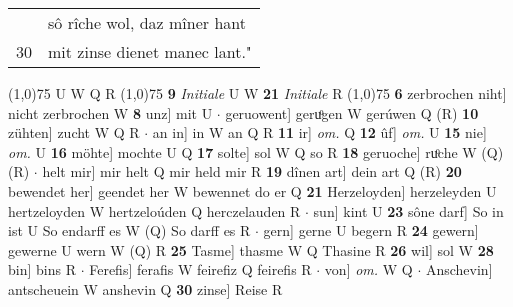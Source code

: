 \documentclass[8pt,a4paper,notitlepage]{article}
\begin{document}
\begin{table}[ht]
\begin{minipage}[t]{0.5\linewidth}
\begin{tabular}{rl}
 & sô rîche wol, daz mîner hant\\ 
30 & mit zinse dienet manec lant."\\ 
\end{tabular}
\scriptsize
\line(1,0){75} \newline
U W Q R \newline
\line(1,0){75} \newline
\textbf{9} \textit{Initiale} U W  \textbf{21} \textit{Initiale} R  \newline
\line(1,0){75} \newline
\textbf{6} zerbrochen niht] nicht zerbrochen W \textbf{8} unz] mit U  $\cdot$ geruowent] geruͦgen W gerúwen Q (R) \textbf{10} zühten] zucht W Q R  $\cdot$ an in] in W an Q R \textbf{11} ir] \textit{om.} Q \textbf{12} ûf] \textit{om.} U \textbf{15} nie] \textit{om.} U \textbf{16} möhte] mochte U Q \textbf{17} solte] sol W Q so R \textbf{18} geruoche] ruͦche W (Q) (R)  $\cdot$ helt mir] mir helt Q mir held mir R \textbf{19} dînen art] dein art Q (R) \textbf{20} bewendet her] geendet her W bewennet do er Q \textbf{21} Herzeloyden] herzeleyden U hertzeloyden W hertzeloúden Q herczelauden R  $\cdot$ sun] kint U \textbf{23} sône darf] So in ist U So endarff es W (Q) So darff es R  $\cdot$ gern] gerne U begern R \textbf{24} gewern] gewerne U wern W (Q) R \textbf{25} Tasme] thasme W Q Thasine R \textbf{26} wil] sol W \textbf{28} bin] bins R  $\cdot$ Ferefis] ferafis W feirefiz Q feirefis R  $\cdot$ von] \textit{om.} W Q  $\cdot$ Anschevin] antscheuein W anshevin Q \textbf{30} zinse] Reise R \newline
\end{minipage}
\end{table}
\end{document}
